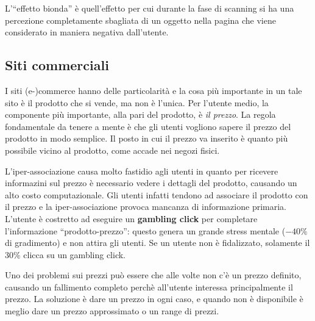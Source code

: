 L'``effetto bionda'' \`e quell'effetto per cui durante la fase di scanning si ha una percezione completamente sbagliata di un oggetto nella pagina che viene considerato in maniera negativa dall'utente.

\subsection{Siti commerciali}

I siti (e-)commerce hanno delle particolarit\`a e la cosa pi\`u importante in un tale sito \`e il prodotto che si vende, ma non \`e l'unica. Per l'utente medio, la componente pi\`u importante, alla pari del prodotto, \`e \textit{il prezzo}. La regola fondamentale da tenere a mente \`e che gli utenti vogliono sapere il prezzo del prodotto in modo semplice. Il posto in cui il prezzo va inserito \`e quanto pi\`u possibile vicino al prodotto, come accade nei negozi fisici.

L'iper-associazione causa molto fastidio agli utenti in quanto per ricevere informazini sul prezzo \`e necessario vedere i dettagli del prodotto, causando un alto costo computazionale. Gli utenti infatti tendono ad associare il prodotto con il prezzo e la iper-associazione provoca mancanza di informazione primaria. L'utente \`e costretto ad eseguire un \textbf{gambling click} per completare l'informazione ``prodotto-prezzo'': questo genera un grande stress mentale ($-40\%$ di gradimento) e non attira gli utenti. Se un utente non \`e fidalizzato, solamente il 30\% clicca su un gambling click.

Uno dei problemi sui prezzi pu\`o essere che alle volte non c'\`e un prezzo definito, causando un fallimento completo perch\`e all'utente interessa principalmente il prezzo. La soluzione \`e dare un prezzo in ogni caso, e quando non \`e disponibile \`e meglio dare un prezzo approssimato o un range di prezzi.
